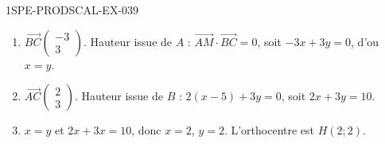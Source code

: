\begin{corrige}{1SPE-PRODSCAL-EX-039}
\begin{enumerate}
\item $\overrightarrow{BC}\begin{pmatrix} -3 \\ 3 \end{pmatrix}$. Hauteur issue de $A$ : $\overrightarrow{AM} \cdot \overrightarrow{BC} = 0$, soit $-3x + 3y = 0$, d'ou $x = y$.
\item $\overrightarrow{AC}\begin{pmatrix} 2 \\ 3 \end{pmatrix}$. Hauteur issue de $B$ : $2(x-5) + 3y = 0$, soit $2x + 3y = 10$.
\item $x = y$ et $2x + 3x = 10$, donc $x = 2$, $y = 2$. L'orthocentre est $H(2; 2)$.
\end{enumerate}
\end{corrige}
